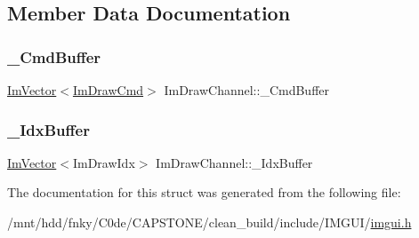 \subsection{Member Data Documentation}
\mbox{\label{structImDrawChannel_a8bb018bc09e2a1f4389c78390a437f78}} 
\subsubsection{\texorpdfstring{\+\_\+\+Cmd\+Buffer}{\_CmdBuffer}}
{\footnotesize\ttfamily \hyperlink{structImVector}{Im\+Vector}$<$\hyperlink{structImDrawCmd}{Im\+Draw\+Cmd}$>$ Im\+Draw\+Channel\+::\+\_\+\+Cmd\+Buffer}

\mbox{\label{structImDrawChannel_abf48aaacbb4908d4b1ff8b54ee85a45f}} 
\subsubsection{\texorpdfstring{\+\_\+\+Idx\+Buffer}{\_IdxBuffer}}
{\footnotesize\ttfamily \hyperlink{structImVector}{Im\+Vector}$<$Im\+Draw\+Idx$>$ Im\+Draw\+Channel\+::\+\_\+\+Idx\+Buffer}



The documentation for this struct was generated from the following file\+:\begin{DoxyCompactItemize}
\item 
/mnt/hdd/fnky/\+C0de/\+C\+A\+P\+S\+T\+O\+N\+E/clean\+\_\+build/include/\+I\+M\+G\+U\+I/\hyperlink{imgui_8h}{imgui.\+h}\end{DoxyCompactItemize}
